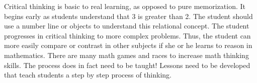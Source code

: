 Critical thinking is basic to real learning, as opposed to pure memorization. It begins early as students understand
that 3 is greater than 2. The student should use a number line or objects to understand this relational concept. The student progresses in critical thinking to more complex problems. Thus, the student can more easily compare or contrast in other subjects if she or he learns to reason in mathematics. There are many math games and races to increase math thinking skills. The process does in fact  need to be taught! Lessons need to be developed that teach students a step by step process of thinking.